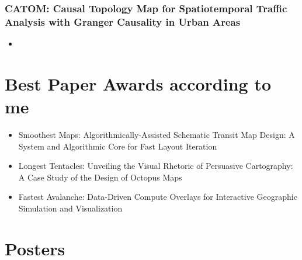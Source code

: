 \documentclass[a4paper]{article}
\begin{document}
\subsubsection{CATOM: Causal Topology Map for Spatiotemporal Traffic Analysis with Granger Causality in Urban Areas}
\begin{itemize}
    \item 
\end{itemize}
\section{Best Paper Awards according to me}
\begin{itemize}
    \item Smoothest Maps: Algorithmically-Assisted Schematic Transit Map Design: A System and Algorithmic Core for Fast Layout Iteration
    \item Longest Tentacles: Unveiling the Visual Rhetoric of Persuasive Cartography: A Case Study of the Design of Octopus Maps
    \item Fastest Avalanche: Data-Driven Compute Overlays for Interactive Geographic Simulation and Visualization
\end{itemize}
\section{Posters}


\printbibliography
\end{document}
